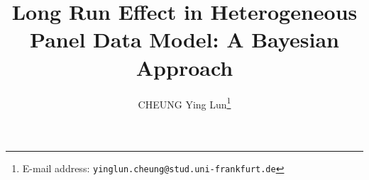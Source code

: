 \documentclass[12pt]{article}
\numberwithin{equation}{section}
\numberwithin{table}{section}
\numberwithin{figure}{section}
\begin{document}

\title{Long Run Effect in Heterogeneous Panel Data Model: A Bayesian Approach}

\author{CHEUNG Ying Lun\thanks{E-mail address: \texttt{yinglun.cheung@stud.uni-frankfurt.de}}}

\date{}              %


\renewcommand{\thefootnote}{\fnsymbol{footnote}}

\singlespacing

\maketitle

\vspace{-.2in}


\medskip


\medskip

\thispagestyle{empty}

\clearpage

\onehalfspacing
\setcounter{footnote}{0}
\renewcommand{\thefootnote}{\arabic{footnote}}
\setcounter{page}{1}







\clearpage
\appendix

\clearpage
%

\clearpage
\appendix


\clearpage



\end{document}
